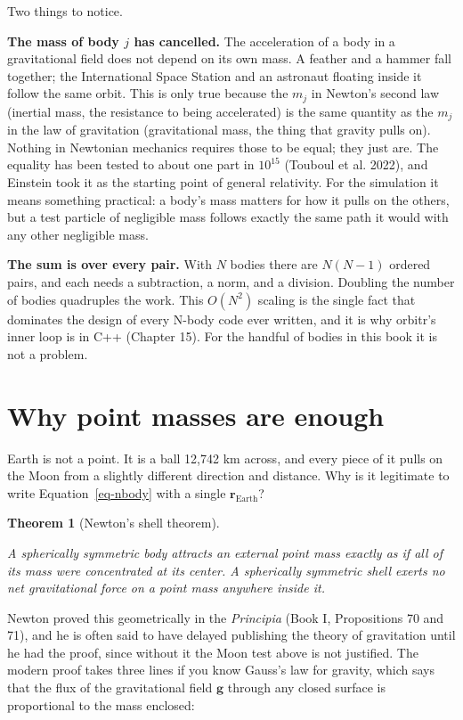 \documentclass[
  10.5pt,
  letterpaper,
]{scrbook}
\theoremstyle{definition}
\theoremstyle{plain}
\newtheorem{theorem}{Theorem}[chapter]
\theoremstyle{remark}
\begin{document}
Two things to notice.

\textbf{The mass of body \(j\) has cancelled.} The acceleration of a
body in a gravitational field does not depend on its own mass. A feather
and a hammer fall together; the International Space Station and an
astronaut floating inside it follow the same orbit. This is only true
because the \(m_j\) in Newton's second law (inertial mass, the
resistance to being accelerated) is the same quantity as the \(m_j\) in
the law of gravitation (gravitational mass, the thing that gravity pulls
on). Nothing in Newtonian mechanics requires those to be equal; they
just are. The equality has been tested to about one part in \(10^{15}\)
({Touboul et al.} 2022), and Einstein took it as the starting point of
general relativity. For the simulation it means something practical: a
body's mass matters for how it pulls on the others, but a test particle
of negligible mass follows exactly the same path it would with any other
negligible mass.

\textbf{The sum is over every pair.} With \(N\) bodies there are
\(N(N-1)\) ordered pairs, and each needs a subtraction, a norm, and a
division. Doubling the number of bodies quadruples the work. This
\(O(N^2)\) scaling is the single fact that dominates the design of every
N-body code ever written, and it is why orbitr's inner loop is in C++
(Chapter 15). For the handful of bodies in this book it is not a
problem.

\section{Why point masses are enough}\label{why-point-masses-are-enough}

Earth is not a point. It is a ball 12,742 km across, and every piece of
it pulls on the Moon from a slightly different direction and distance.
Why is it legitimate to write Equation~\ref{eq-nbody} with a single
\(\mathbf{r}_{\mathrm{Earth}}\)?

\begin{theorem}[Newton's shell
theorem]\protect\hypertarget{thm-shell}{}\label{thm-shell}

A spherically symmetric body attracts an external point mass exactly as
if all of its mass were concentrated at its center. A spherically
symmetric shell exerts no net gravitational force on a point mass
anywhere inside it.

\end{theorem}

Newton proved this geometrically in the \emph{Principia} (Book I,
Propositions 70 and 71), and he is often said to have delayed publishing
the theory of gravitation until he had the proof, since without it the
Moon test above is not justified. The modern proof takes three lines if
you know Gauss's law for gravity, which says that the flux of the
gravitational field \(\mathbf{g}\) through any closed surface is
proportional to the mass enclosed:
\end{document}
